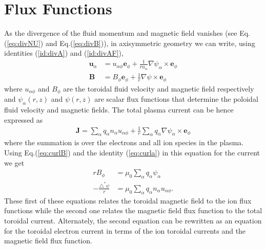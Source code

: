\documentclass[11pt, reqno]{amsart}
\newcommand{\eqr}[1]{Eq.\thinspace(#1)}
\newcommand{\mvec}[1]{\mathbf{#1}}
\newcommand{\eep}{\mvec{e}_\phi}
\theoremstyle{definition}
\begin{document}
\section{Flux Functions}

As the divergence of the fluid momentum and magnetic field vanishes
(see \eqr{\ref{eq:divNU}} and \eqr{\ref{eq:divB}}), in axisymmetric
geometry we can write, using identities (\ref{id:divA}) and
(\ref{id:divAF}),
\begin{align}
  \mvec{u}_\alpha &= u_{\alpha \phi} \eep +
  \frac{1}{r n_\alpha}\nabla\psi_\alpha \times \eep \label{eq:uform} \\
  \mvec{B} &= B_{\phi} \eep +
  \frac{1}{r}\nabla\psi \times \eep \label{eq:bform}
\end{align}
where $u_{\alpha \phi}$ and $B_{\phi}$ are the toroidal fluid velocity
and magnetic field respectively and $\psi_\alpha(r,z)$ and $\psi(r,z)$
are scalar flux functions that determine the poloidal fluid velocity
and magnetic fields. The total plasma current can be hence expressed
as
\begin{align}
  \mvec{J} = \sum_\alpha q_\alpha n_\alpha u_{\alpha \phi}
  + \frac{1}{r}\sum_\alpha q_\alpha \nabla \psi_\alpha \times \eep
\end{align}
where the summation is over the electrons and all ion species in the
plasma. Using \eqr{\ref{eq:curlB}} and the identity (\ref{eq:curla})
in this equation for the current we get
\begin{align}
  rB_\phi &= \mu_0\sum_\alpha q_\alpha \psi_\alpha \\
  -\frac{\triangle^*\psi}{r} &=
  \mu_0 \sum_\alpha q_\alpha n_\alpha u_{\alpha \phi}.
  \label{eq:rBphi}
\end{align}
These first of these equations relates the toroidal magnetic field to
the ion flux functions while the second one relates the magnetic field
flux function to the total toroidal current. Alternately, the second
equation can be rewritten as an equation for the toroidal electron
current in terms of the ion toroidal currents and the magnetic field
flux function.
\end{document}
